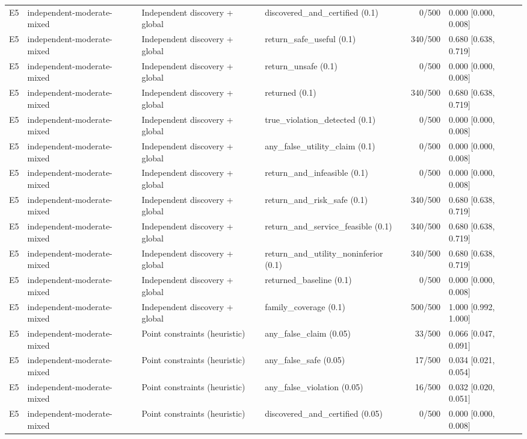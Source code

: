 \begin{longtable}{p{.04\linewidth}p{.18\linewidth}p{.19\linewidth}p{.16\linewidth}r p{.21\linewidth}}
E5 & independent-moderate-mixed & Independent discovery + global & discovered\_and\_certified (0.1) & 0/500 & 0.000 [0.000, 0.008]\\
E5 & independent-moderate-mixed & Independent discovery + global & return\_safe\_useful (0.1) & 340/500 & 0.680 [0.638, 0.719]\\
E5 & independent-moderate-mixed & Independent discovery + global & return\_unsafe (0.1) & 0/500 & 0.000 [0.000, 0.008]\\
E5 & independent-moderate-mixed & Independent discovery + global & returned (0.1) & 340/500 & 0.680 [0.638, 0.719]\\
E5 & independent-moderate-mixed & Independent discovery + global & true\_violation\_detected (0.1) & 0/500 & 0.000 [0.000, 0.008]\\
E5 & independent-moderate-mixed & Independent discovery + global & any\_false\_utility\_claim (0.1) & 0/500 & 0.000 [0.000, 0.008]\\
E5 & independent-moderate-mixed & Independent discovery + global & return\_and\_infeasible (0.1) & 0/500 & 0.000 [0.000, 0.008]\\
E5 & independent-moderate-mixed & Independent discovery + global & return\_and\_risk\_safe (0.1) & 340/500 & 0.680 [0.638, 0.719]\\
E5 & independent-moderate-mixed & Independent discovery + global & return\_and\_service\_feasible (0.1) & 340/500 & 0.680 [0.638, 0.719]\\
E5 & independent-moderate-mixed & Independent discovery + global & return\_and\_utility\_noninferior (0.1) & 340/500 & 0.680 [0.638, 0.719]\\
E5 & independent-moderate-mixed & Independent discovery + global & returned\_baseline (0.1) & 0/500 & 0.000 [0.000, 0.008]\\
E5 & independent-moderate-mixed & Independent discovery + global & family\_coverage (0.1) & 500/500 & 1.000 [0.992, 1.000]\\
E5 & independent-moderate-mixed & Point constraints (heuristic) & any\_false\_claim (0.05) & 33/500 & 0.066 [0.047, 0.091]\\
E5 & independent-moderate-mixed & Point constraints (heuristic) & any\_false\_safe (0.05) & 17/500 & 0.034 [0.021, 0.054]\\
E5 & independent-moderate-mixed & Point constraints (heuristic) & any\_false\_violation (0.05) & 16/500 & 0.032 [0.020, 0.051]\\
E5 & independent-moderate-mixed & Point constraints (heuristic) & discovered\_and\_certified (0.05) & 0/500 & 0.000 [0.000, 0.008]\\

\end{longtable}
